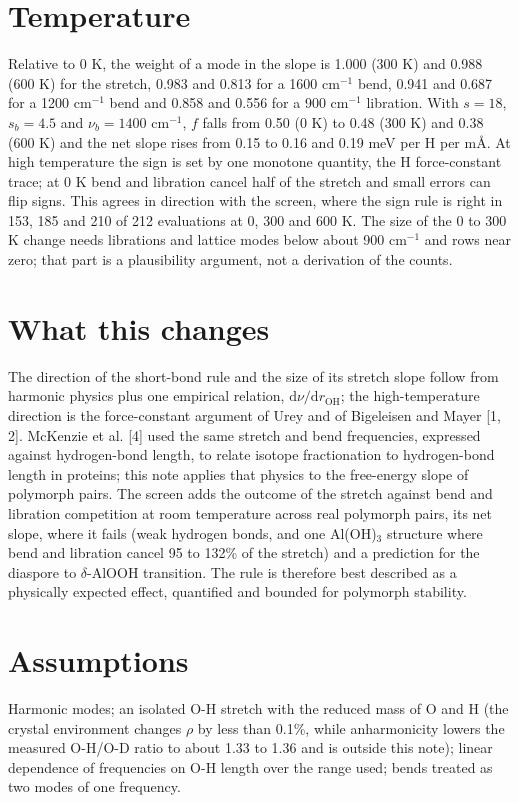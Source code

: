 \documentclass[11pt,a4paper]{article}
\begin{document}
\section{Temperature}
Relative to 0 K, the weight of a mode in the slope is 1.000 (300 K) and 0.988 (600 K) for the stretch, 0.983 and 0.813 for a 1600 cm$^{-1}$ bend, 0.941 and 0.687 for a 1200 cm$^{-1}$ bend and 0.858 and 0.556 for a 900 cm$^{-1}$ libration. With $s = 18$, $s_b = 4.5$ and $\nu_b = 1400$ cm$^{-1}$, $f$ falls from 0.50 (0 K) to 0.48 (300 K) and 0.38 (600 K) and the net slope rises from 0.15 to 0.16 and 0.19 meV per H per m\AA. At high temperature the sign is set by one monotone quantity, the H force-constant trace; at 0 K bend and libration cancel half of the stretch and small errors can flip signs. This agrees in direction with the screen, where the sign rule is right in 153, 185 and 210 of 212 evaluations at 0, 300 and 600 K. The size of the 0 to 300 K change needs librations and lattice modes below about 900 cm$^{-1}$ and rows near zero; that part is a plausibility argument, not a derivation of the counts.

\section{What this changes}
The direction of the short-bond rule and the size of its stretch slope follow from harmonic physics plus one empirical relation, $\mathrm d\nu/\mathrm d r_{\mathrm{OH}}$; the high-temperature direction is the force-constant argument of Urey and of Bigeleisen and Mayer [1, 2]. McKenzie et al. [4] used the same stretch and bend frequencies, expressed against hydrogen-bond length, to relate isotope fractionation to hydrogen-bond length in proteins; this note applies that physics to the free-energy slope of polymorph pairs. The screen adds the outcome of the stretch against bend and libration competition at room temperature across real polymorph pairs, its net slope, where it fails (weak hydrogen bonds, and one Al(OH)$_3$ structure where bend and libration cancel 95 to 132\% of the stretch) and a prediction for the diaspore to $\delta$-AlOOH transition. The rule is therefore best described as a physically expected effect, quantified and bounded for polymorph stability.

\section{Assumptions}
Harmonic modes; an isolated O-H stretch with the reduced mass of O and H (the crystal environment changes $\rho$ by less than 0.1\%, while anharmonicity lowers the measured O-H/O-D ratio to about 1.33 to 1.36 and is outside this note); linear dependence of frequencies on O-H length over the range used; bends treated as two modes of one frequency.
\end{document}
